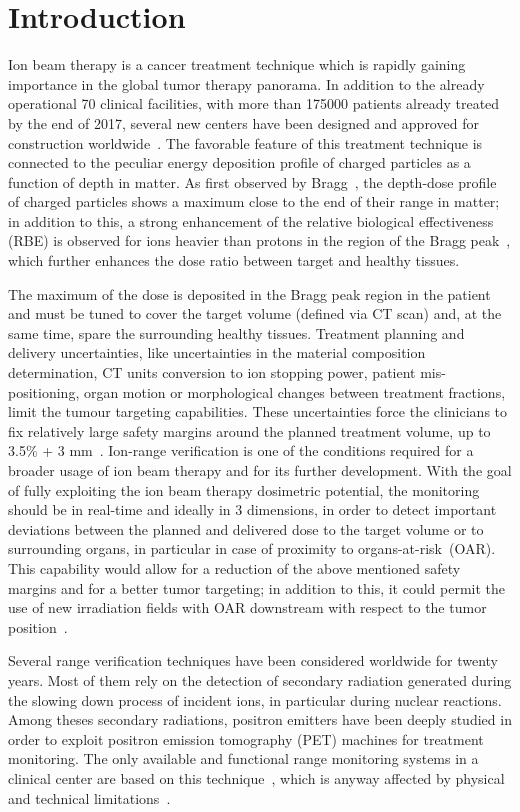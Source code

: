\section{Introduction}\label{section::Intro}
Ion beam therapy is a cancer treatment technique which is rapidly gaining importance in the global tumor therapy panorama. In addition to the already operational 70 clinical facilities, with more than 175000 patients already treated by the end of 2017, several new centers have been designed and approved for construction worldwide~\cite{PTCOG_stats}. The favorable feature of this treatment technique is connected to the peculiar energy deposition profile of charged particles as a function of depth in matter. As first observed by Bragg~\cite{Bragg_main}, the depth-dose profile of charged particles shows a maximum close to the end of their range in matter; in addition to this, a strong enhancement of the relative biological effectiveness (RBE) is observed for ions heavier than protons in the region of the Bragg peak~\cite{RBE_Elsasser, RBE_Weyrather}, which further enhances the dose ratio between target and healthy tissues.

The maximum of the dose is deposited in the Bragg peak region in the patient and must be tuned to cover the target volume (defined via CT scan) and, at the same time, spare the surrounding healthy tissues. Treatment planning and delivery uncertainties, like uncertainties in the material composition determination, CT units conversion to ion stopping power, patient mis-positioning, organ motion or morphological changes between treatment fractions, limit the tumour targeting capabilities. These uncertainties force the clinicians to fix relatively large safety margins around the planned treatment volume, up to 3.5\% + 3 mm~\cite{Paganetti:2012aa}. Ion-range verification is one of the conditions required for a broader usage of ion beam therapy and for its further development. With the goal of fully exploiting the ion beam therapy dosimetric potential, the monitoring should be in real-time and ideally in 3 dimensions, in order to detect important deviations between the planned and delivered dose to the target volume or to surrounding organs, in particular in case of proximity to organs-at-risk~(OAR). This capability would allow for a reduction of the above mentioned safety margins and for a better tumor targeting; in addition to this, it could permit the use of new irradiation fields with OAR downstream with respect to the tumor position~\cite{Knopf:2013aa}.   

Several range verification techniques have been considered worldwide for twenty years. Most of them rely on the detection of secondary radiation generated during the slowing down process of incident ions, in particular during nuclear reactions. Among theses secondary radiations, positron emitters have been deeply studied in order to exploit positron emission tomography (PET) machines for treatment monitoring. The only available and functional range monitoring systems in a clinical center are based on this technique~\cite{ENGHARDT2004, Yamaya2018}, which is anyway affected by physical and technical limitations~\cite{PARODI2016}.

